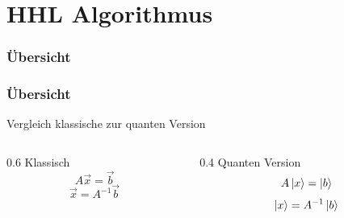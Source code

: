 \section{HHL Algorithmus}

\subsubsection{Übersicht}

    \begin{frame}
    \frametitle{Übersicht}
        Vergleich klassische zur quanten Version

        \hfil

        \begin{columns}[c]
            \begin{column}{0.6\hsize}\centering
            Klassisch
            $$A \vec{x} = \vec{b}$$
            $$\vec{x} = A^{-1}\vec{b}$$
            \end{column}

            \begin{column}{0.4\hsize}
            Quanten Version
            $$A \ket{x} = \ket{b}$$
            $$\ket{x} = A^{-1}\ket{b}$$
            \end{column}
        \end{columns}

    

    \end{frame}


